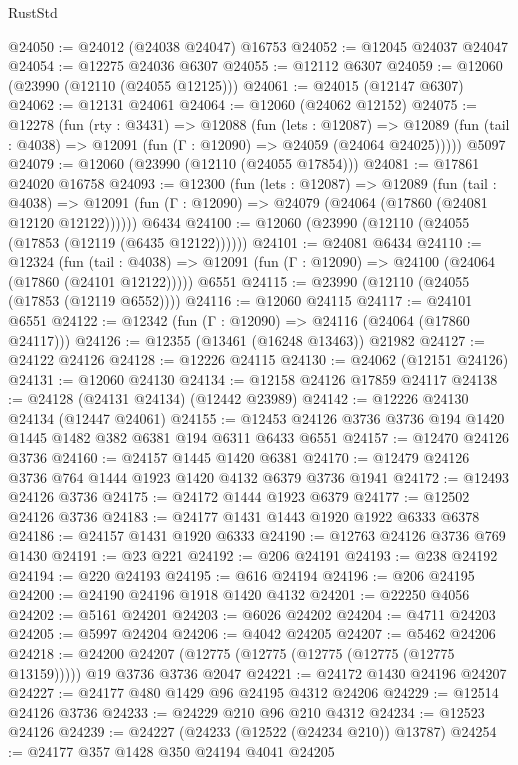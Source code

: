 \begin{lexlean}{RustStd}
\begin{coremodule}
@24050 := @24012 (@24038 @24047) @16753
@24052 := @12045 @24037 @24047
@24054 := @12275 @24036 @6307
@24055 := @12112 @6307
@24059 := @12060 (@23990 (@12110 (@24055 @12125)))
@24061 := @24015 (@12147 @6307)
@24062 := @12131 @24061
@24064 := @12060 (@24062 @12152)
@24075 := @12278
    (fun (rty : @3431) =>
    @12088
      (fun (lets : @12087) =>
      @12089 (fun (tail : @4038) => @12091 (fun (Γ : @12090) => @24059 (@24064 @24025)))))
    @5097
@24079 := @12060 (@23990 (@12110 (@24055 @17854)))
@24081 := @17861 @24020 @16758
@24093 := @12300
    (fun (lets : @12087) =>
    @12089
      (fun (tail : @4038) =>
      @12091 (fun (Γ : @12090) => @24079 (@24064 (@17860 (@24081 @12120 @12122))))))
    @6434
@24100 := @12060 (@23990 (@12110 (@24055 (@17853 (@12119 (@6435 @12122))))))
@24101 := @24081 @6434
@24110 := @12324
    (fun (tail : @4038) => @12091 (fun (Γ : @12090) => @24100 (@24064 (@17860 (@24101 @12122)))))
    @6551
@24115 := @23990 (@12110 (@24055 (@17853 (@12119 @6552))))
@24116 := @12060 @24115
@24117 := @24101 @6551
@24122 := @12342 (fun (Γ : @12090) => @24116 (@24064 (@17860 @24117)))
@24126 := @12355 (@13461 (@16248 @13463)) @21982
@24127 := @24122 @24126
@24128 := @12226 @24115
@24130 := @24062 (@12151 @24126)
@24131 := @12060 @24130
@24134 := @12158 @24126 @17859 @24117
@24138 := @24128 (@24131 @24134) (@12442 @23989)
@24142 := @12226 @24130 @24134 (@12447 @24061)
@24155 := @12453 @24126 @3736 @3736 @194 @1420 @1445 @1482 @382 @6381 @194 @6311 @6433 @6551
@24157 := @12470 @24126 @3736
@24160 := @24157 @1445 @1420 @6381
@24170 := @12479 @24126 @3736 @764 @1444 @1923 @1420 @4132 @6379 @3736 @1941
@24172 := @12493 @24126 @3736
@24175 := @24172 @1444 @1923 @6379
@24177 := @12502 @24126 @3736
@24183 := @24177 @1431 @1443 @1920 @1922 @6333 @6378
@24186 := @24157 @1431 @1920 @6333
@24190 := @12763 @24126 @3736 @769 @1430
@24191 := @23 @221
@24192 := @206 @24191
@24193 := @238 @24192
@24194 := @220 @24193
@24195 := @616 @24194
@24196 := @206 @24195
@24200 := @24190 @24196 @1918 @1420 @4132
@24201 := @22250 @4056
@24202 := @5161 @24201
@24203 := @6026 @24202
@24204 := @4711 @24203
@24205 := @5997 @24204
@24206 := @4042 @24205
@24207 := @5462 @24206
@24218 := @24200 @24207 (@12775 (@12775 (@12775 (@12775 (@12775 @13159))))) @19 @3736 @3736 @2047
@24221 := @24172 @1430 @24196 @24207
@24227 := @24177 @480 @1429 @96 @24195 @4312 @24206
@24229 := @12514 @24126 @3736
@24233 := @24229 @210 @96 @210 @4312
@24234 := @12523 @24126
@24239 := @24227 (@24233 (@12522 (@24234 @210)) @13787)
@24254 := @24177
    @357
    @1428
    @350
    @24194
    @4041
    @24205

\end{coremodule}
\end{lexlean}
